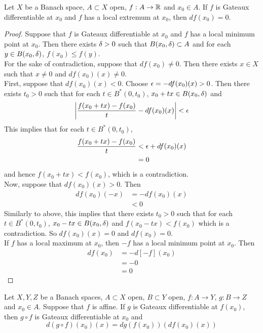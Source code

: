 \documentclass{book}
\begin{document}
	\begin{ex} 
	Let $X$ be a Banach space, $A \subset X$ open, $f:A \rightarrow \mathbb{R}$ and $x_0 \in A$. If $f$ is Gateaux differentiable at $x_0$ and $f$ has a local extremum at $x_0$, then $df(x_0) = 0$.
	\end{ex}	
	
	\begin{proof}
	Suppose that $f$ is Gateaux differentiable at $x_0$ and $f$ has a local minimum point at $x_0$. Then there exists $\delta >0 $ such that $B(x_0, \delta) \subset A$ and for each $y \in B(x_0, \delta)$, $f(x_0) \leq f(y)$. \\
	For the sake of contradiction, suppose that $df(x_0) \neq 0$. Then there exists $x \in X$ such that $x \neq 0$ and $df(x_0)(x) \neq 0$. \\
	First, suppose that $df(x_0)(x) < 0$. Choose $\epsilon = -df(x_0)(x) >0$. Then there exists $t_0 >0$ such that for each $t \in B^*(0, t_0)$, $x_0 + tx \in B(x_0, \delta)$ and $$\bigg | \frac{f(x_0 + tx) - f(x_0)}{t} - df(x_0)(x) \bigg | < \epsilon$$ 
	This implies that for each $t \in B^*(0, t_0)$,
	\begin{align*}
	\frac{f(x_0 + tx) - f(x_0)}{t}  
	&< \epsilon + df(x_0)(x) \\
	&= 0
	\end{align*} 
	and hence $f(x_0 + tx) < f(x_0)$, which is a contradiction. \\
	Now, suppose that $df(x_0)(x) > 0$. Then 
	\begin{align*}
	df(x_0)(-x) 
	&= -df(x_0)(x) \\
	& < 0
	\end{align*}
	Similarly to above, this implies that there exists $t_0 >0$ such that for each $t \in B^*(0, t_0)$, $x_0 - tx \in B(x_0, \delta)$ and $f(x_0 - tx) < f(x_0)$ which is a contradiction. So $df(x_0)(x) = 0$ and $df(x_0) = 0$. \\
	If $f$ has a local maximum at $x_0$, then $-f$ has a local minimum point at $x_0$. Then 
	\begin{align*}
	df(x_0)
	&= -d[-f](x_0) \\
	&= -0 \\
	&= 0
\end{align*}	 
	\end{proof}
	
	\begin{ex} 
	Let $X, Y, Z$ be a Banach spaces, $A \subset X$ open, $B \subset Y$ open, $f:A \rightarrow Y$, $g:B \rightarrow Z$ and $x_0 \in A$. Suppose that $f$ is affine. If $g$ is Gateaux differentiable at $f(x_0)$, then $g \circ f$ is Gateaux differentiable at $x_0$ and $$d(g \circ f)(x_0)(x) = dg(f(x_0))(df(x_0)(x))$$
	\end{ex}
	
\end{document}
